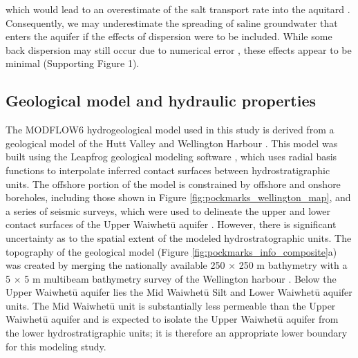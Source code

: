 \documentclass[draft, 10pt]{agujournal2019}
\begin{document}
 which would lead to an overestimate of the salt transport rate into the aquitard \cite{smith_mixed_2004, irvine_upstream_2021}. Consequently, we may underestimate the spreading of saline groundwater that enters the aquifer if the effects of dispersion were to be included. While some back dispersion may still occur due to numerical error \cite{woods_numerical_2003}, these effects appear to be minimal (Supporting Figure 1). 

\subsection{Geological model and hydraulic properties}
The MODFLOW6 hydrogeological model used in this study is derived from a geological model of the Hutt Valley and Wellington Harbour \cite{begg_revised_2023}. This model was built using the Leapfrog geological modeling software \cite{seequent_ltd_leapfrog_2020}, which uses radial basis functions to interpolate inferred contact surfaces between hydrostratigraphic units. The offshore portion of the model is constrained by offshore and onshore boreholes, including those shown in Figure \ref{fig:pockmarks_wellington_map}, and a series of seismic surveys, which were used to delineate the upper and lower contact surfaces of the Upper Waiwhetū aquifer \cite{stantec_gear_2022, begg_lower_2020}. However, there is significant uncertainty as to the spatial extent of the modeled hydrostratographic units. The topography of the geological model (Figure \ref{fig:pockmarks_info_composite}a) was created by merging the nationally available 250 $\times$ 250 m bathymetry \cite{niwa_new_2016} with a 5 $\times$ 5 m multibeam bathymetry survey of the Wellington harbour \cite{hoffmann_fresh_2023}. Below the Upper Waiwhetū aquifer lies the Mid Waiwhetū Silt and Lower Waiwhetū aquifer units. The Mid Waiwhetū unit is substantially less permeable than the Upper Waiwhetū aquifer and is expected to isolate the Upper Waiwhetū aquifer from the lower hydrostratigraphic units; it is therefore an appropriate lower boundary for this modeling study. 
\end{document}
